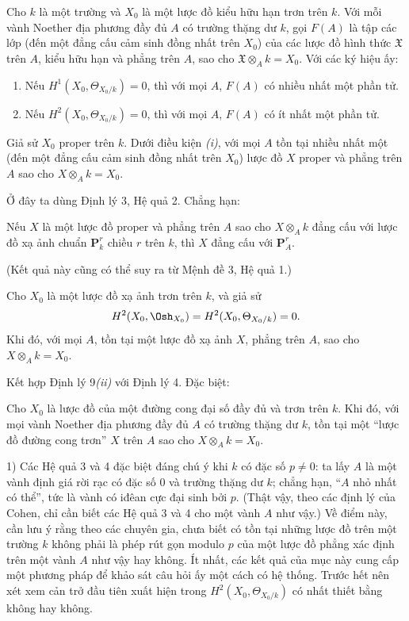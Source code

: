  Cho $k$ là một trường và $X_0$ là một lược đồ kiểu hữu
hạn trơn trên $k$. Với mỗi vành Noether địa phương đầy đủ $A$ có trường thặng
dư $k$, gọi $F(A)$ là tập các lớp (đến một đẳng cấu cảm sinh đồng nhất trên
$X_0$) của các lược đồ hình thức $\mathfrak X$ trên $A$, kiểu hữu hạn và phẳng
trên $A$, sao cho $\mathfrak X\otimes_A k=X_0$. Với các ký hiệu ấy:
\begin{enumerate}
  \item[\textit{i.}] Nếu $H^1(X_0,\Theta_{X_0/k})=0$, thì với mọi $A$,
    $F(A)$ có nhiều nhất một phần tử.
  \item[\textit{ii.}] Nếu $H^2(X_0,\Theta_{X_0/k})=0$, thì với mọi $A$,
    $F(A)$ có ít nhất một phần tử.
\end{enumerate}

 Giả sử $X_0$ proper trên $k$. Dưới điều kiện
\textit{(i)}, với mọi $A$ tồn tại nhiều nhất một (đến một đẳng cấu cảm sinh
đồng nhất trên $X_0$) lược đồ $X$ proper và phẳng trên $A$ sao cho
$X\otimes_A k=X_0$.

Ở đây ta dùng Định lý 3, Hệ quả 2. Chẳng hạn:

 Nếu $X$ là một lược đồ proper và phẳng trên $A$ sao cho
$X\otimes_A k$ đẳng cấu với lược đồ xạ ảnh chuẩn $\mathbf P_k^r$ chiều $r$
trên $k$, thì $X$ đẳng cấu với $\mathbf P_A^r$.

(Kết quả này cũng có thể suy ra từ Mệnh đề 3, Hệ quả 1.)

 Cho $X_0$ là một lược đồ xạ ảnh trơn trên $k$, và giả sử
\[
  H^2(X_0,\Osh_{X_0})=H^2(X_0,\Theta_{X_0/k})=0.
\]
Khi đó, với mọi $A$, tồn tại một lược đồ xạ ảnh $X$, phẳng trên $A$, sao cho
$X\otimes_A k=X_0$.

Kết hợp Định lý 9\textit{(ii)} với Định lý 4. Đặc biệt:

 Cho $X_0$ là lược đồ của một đường cong đại số đầy đủ và
trơn trên $k$. Khi đó, với mọi vành Noether địa phương đầy đủ $A$ có trường
thặng dư $k$, tồn tại một “lược đồ đường cong trơn” $X$ trên $A$ sao cho
$X\otimes_A k=X_0$.


1) Các Hệ quả 3 và 4 đặc biệt đáng chú ý khi $k$ có đặc số $p\ne0$: ta lấy
$A$ là một vành định giá rời rạc có đặc số $0$ và trường thặng dư $k$; chẳng
hạn, “$A$ nhỏ nhất có thể”, tức là vành có iđêan cực đại sinh bởi $p$. (Thật
vậy, theo các định lý của Cohen, chỉ cần biết các Hệ quả 3 và 4 cho một vành
$A$ như vậy.) Về điểm này, cần lưu ý rằng theo các chuyên gia, chưa biết có
tồn tại những lược đồ trên một trường $k$ không phải là phép rút gọn modulo
$p$ của một lược đồ phẳng xác định trên một vành $A$ như vậy hay không. Ít
nhất, các kết quả của mục này cung cấp một phương pháp để khảo sát câu hỏi ấy
một cách có hệ thống. Trước hết nên xét xem cản trở đầu tiên xuất hiện trong
$H^2(X_0,\Theta_{X_0/k})$ có nhất thiết bằng không hay không.

